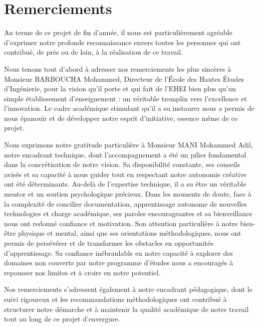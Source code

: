 \documentclass[12pt,a4paper]{report}
\newcommand{\headingfont}{}
\begin{document}
	\newpage
	\chapter*{{\headingfont Remerciements}}
	
	Au terme de ce projet de fin d'année, il nous est particulièrement agréable d'exprimer notre profonde reconnaissance envers toutes les personnes qui ont contribué, de près ou de loin, à la réalisation de ce travail.
	
	Nous tenons tout d'abord à adresser nos remerciements les plus sincères à Monsieur BARBOUCHA Mohammed, Directeur de l'École des Hautes Études d'Ingénierie, pour la vision qu'il porte et qui fait de l'EHEI bien plus qu'un simple établissement d'enseignement : un véritable tremplin vers l'excellence et l'innovation. Le cadre académique stimulant qu'il a su instaurer nous a permis de nous épanouir et de développer notre esprit d'initiative, essence même de ce projet.
	
	Nous exprimons notre gratitude particulière à Monsieur MANI Mohammed Adil, notre encadrant technique, dont l'accompagnement a été un pilier fondamental dans la concrétisation de notre vision. Sa disponibilité constante, ses conseils avisés et sa capacité à nous guider tout en respectant notre autonomie créative ont été déterminants. Au-delà de l'expertise technique, il a su être un véritable mentor et un soutien psychologique précieux. Dans les moments de doute, face à la complexité de concilier documentation, apprentissage autonome de nouvelles technologies et charge académique, ses paroles encourageantes et sa bienveillance nous ont redonné confiance et motivation. Son attention particulière à notre bien-être physique et mental, ainsi que ses orientations méthodologiques, nous ont permis de persévérer et de transformer les obstacles en opportunités d'apprentissage. Sa confiance inébranlable en notre capacité à explorer des domaines non couverts par notre programme d'études nous a encouragés à repousser nos limites et à croire en notre potentiel.
	
	Nos remerciements s'adressent également à notre encadrant pédagogique, dont le suivi rigoureux et les recommandations méthodologiques ont contribué à structurer notre démarche et à maintenir la qualité académique de notre travail tout au long de ce projet d'envergure.
	
\end{document}

